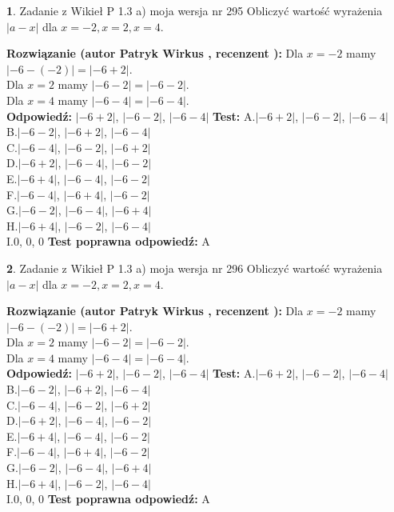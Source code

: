\documentclass[12pt, a4paper]{article}
\theoremstyle{definition} %
\newtheorem{zad}{}
\newcommand{\zadStart}[1]{\begin{zad}#1\newline}
\newcommand{\zadStop}{\end{zad}}
\newcommand{\rozwStart}[2]{\noindent \textbf{Rozwiązanie (autor #1 , recenzent #2): }\newline}
\newcommand{\rozwStop}{\newline}
\newcommand{\odpStart}{\noindent \textbf{Odpowiedź:}\newline}
\newcommand{\odpStop}{\newline}
\newcommand{\testStart}{\noindent \textbf{Test:}\newline}
\newcommand{\testStop}{\newline}
\newcommand{\kluczStart}{\noindent \textbf{Test poprawna odpowiedź:}\newline}
\newcommand{\kluczStop}{\newline}
\begin{document}
\zadStart{Zadanie z Wikieł P 1.3 a) moja wersja nr 295}
Obliczyć wartość wyrażenia $|a - x|$ dla $x=-2,x=2,x=4$.
\zadStop
\rozwStart{Patryk Wirkus}{}
Dla $x = -2$ mamy $|-6 - (-2)| = |-6 + 2|$.\\
Dla $x = 2$ mamy $|-6 - 2| = |-6 - 2|$.\\
Dla $x = 4$ mamy $|-6 - 4| = |-6 - 4|$.\\
\rozwStop
\odpStart
$|-6 + 2|$, $|-6 - 2|$, $|-6 - 4|$
\odpStop
\testStart
A.$|-6 + 2|$, $|-6 - 2|$, $|-6 - 4|$\\
B.$|-6 - 2|$, $|-6 + 2|$, $|-6 - 4|$\\
C.$|-6 - 4|$, $|-6 - 2|$, $|-6 + 2|$\\
D.$|-6 + 2|$, $|-6 - 4|$, $|-6 - 2|$\\
E.$|-6 + 4|$, $|-6 - 4|$, $|-6 - 2|$\\
F.$|-6 - 4|$, $|-6 + 4|$, $|-6 - 2|$\\
G.$|-6 - 2|$, $|-6 - 4|$, $|-6 + 4|$\\
H.$|-6 + 4|$, $|-6 - 2|$, $|-6 - 4|$\\
I.$0$, $0$, $0$
\testStop
\kluczStart
A
\kluczStop



\zadStart{Zadanie z Wikieł P 1.3 a) moja wersja nr 296}
Obliczyć wartość wyrażenia $|a - x|$ dla $x=-2,x=2,x=4$.
\zadStop
\rozwStart{Patryk Wirkus}{}
Dla $x = -2$ mamy $|-6 - (-2)| = |-6 + 2|$.\\
Dla $x = 2$ mamy $|-6 - 2| = |-6 - 2|$.\\
Dla $x = 4$ mamy $|-6 - 4| = |-6 - 4|$.\\
\rozwStop
\odpStart
$|-6 + 2|$, $|-6 - 2|$, $|-6 - 4|$
\odpStop
\testStart
A.$|-6 + 2|$, $|-6 - 2|$, $|-6 - 4|$\\
B.$|-6 - 2|$, $|-6 + 2|$, $|-6 - 4|$\\
C.$|-6 - 4|$, $|-6 - 2|$, $|-6 + 2|$\\
D.$|-6 + 2|$, $|-6 - 4|$, $|-6 - 2|$\\
E.$|-6 + 4|$, $|-6 - 4|$, $|-6 - 2|$\\
F.$|-6 - 4|$, $|-6 + 4|$, $|-6 - 2|$\\
G.$|-6 - 2|$, $|-6 - 4|$, $|-6 + 4|$\\
H.$|-6 + 4|$, $|-6 - 2|$, $|-6 - 4|$\\
I.$0$, $0$, $0$
\testStop
\kluczStart
A
\kluczStop
\end{document}
